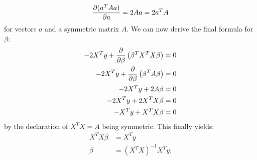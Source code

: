     \begin{align}
        \pdv{(a^TAa)}{a} = 2Aa = 2a^TA
    \end{align}
    for vectors $a$ and a symmetric matrix $A$. We can now derive the final formula for $\beta$:
    \begin{align}
        -2 X^Ty + \pdv{}{\beta} \left( \beta^TX^TX\beta \right) &= 0 \\
        -2 X^Ty + \pdv{}{\beta} \left( \beta^TA\beta \right) &= 0 \\
        -2 X^Ty + 2A\beta &= 0 \\
        -2 X^Ty + 2X^TX\beta &= 0 \\
        -X^Ty + X^TX\beta &= 0
    \end{align}
    by the declaration of $X^TX=A$ being symmetric. This finally yields:
    \begin{align}
        X^TX\beta &= X^Ty \\
        \beta &= \left( X^TX \right)^{-1}X^Ty.
    \end{align}
    \\
    